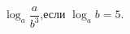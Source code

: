 \begin{ex}[type=calculate_expression]
	\begin{condition}
		\( \log_a\dfrac{a}{b^3} \),\quad если \( \log_a b = 5 \).
	\end{condition}
\end{ex}